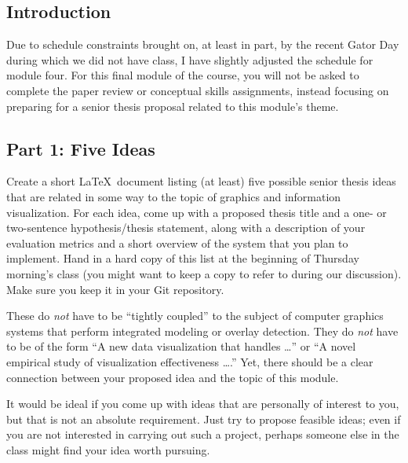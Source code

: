

\usepackage[compact]{titlesec}




\subsection*{Introduction}

Due to schedule constraints brought on, at least in part, by the recent Gator Day during which we did not have class, I
have slightly adjusted the schedule for module four. For this final module of the course, you will not be asked to
complete the paper review or conceptual skills assignments, instead focusing on preparing for a senior thesis proposal
related to this module's theme.

\subsection*{Part 1: Five Ideas}

Create a short \LaTeX\ document listing (at least) five possible senior thesis ideas that are related in some way to the
topic of graphics and information visualization. For each idea, come up with a proposed thesis title and a one- or
two-sentence hypothesis/thesis statement, along with a description of your evaluation metrics and a short overview of
the system that you plan to implement. Hand in a hard copy of this list at the beginning of Thursday morning's class
(you might want to keep a copy to refer to during our discussion). Make sure you keep it in your Git
repository.

These do {\em not} have to be ``tightly coupled'' to the subject of computer graphics systems that perform integrated
modeling or overlay detection. They do {\em not} have to be of the form ``A new data visualization that handles \ldots''
or ``A novel empirical study of visualization effectiveness \ldots.'' Yet, there should be a clear connection between
your proposed idea and the topic of this module.

It would be ideal if you come up with ideas that are personally of interest to you, but that is not an absolute
requirement. Just try to propose feasible ideas; even if you are not interested in carrying out such a project, perhaps
someone else in the class might find your idea worth pursuing.

